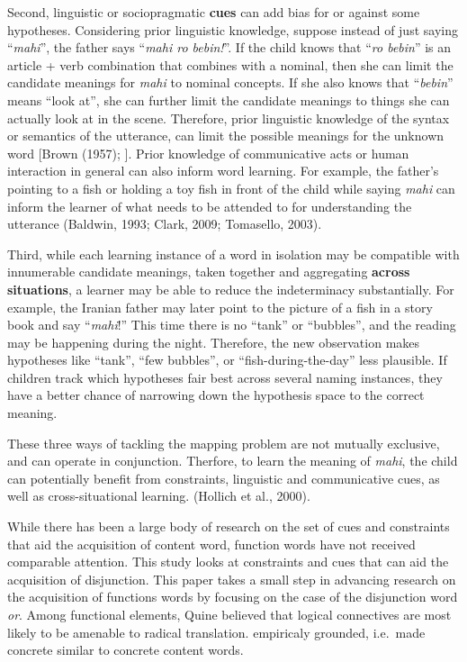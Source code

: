\documentclass[,man,floatsintext]{apa6}
\begin{document}
Second, linguistic or sociopragmatic \textbf{cues} can add bias for or against some hypotheses. Considering prior linguistic knowledge, suppose instead of just saying \enquote{\emph{mahi}}, the father says \enquote{\emph{mahi ro bebin!}}. If the child knows that \enquote{\emph{ro bebin}} is an article + verb combination that combines with a nominal, then she can limit the candidate meanings for \emph{mahi} to nominal concepts. If she also knows that \enquote{\emph{bebin}} means \enquote{look at}, she can further limit the candidate meanings to things she can actually look at in the scene. Therefore, prior linguistic knowledge of the syntax or semantics of the utterance, can limit the possible meanings for the unknown word {[}Brown (1957); {]}. Prior knowledge of communicative acts or human interaction in general can also inform word learning. For example, the father's pointing to a fish or holding a toy fish in front of the child while saying \emph{mahi} can inform the learner of what needs to be attended to for understanding the utterance (Baldwin, 1993; Clark, 2009; Tomasello, 2003).

Third, while each learning instance of a word in isolation may be compatible with innumerable candidate meanings, taken together and aggregating \textbf{across situations}, a learner may be able to reduce the indeterminacy substantially. For example, the Iranian father may later point to the picture of a fish in a story book and say \enquote{\emph{mahi}!} This time there is no \enquote{tank} or \enquote{bubbles}, and the reading may be happening during the night. Therefore, the new observation makes hypotheses like \enquote{tank}, \enquote{few bubbles}, or \enquote{fish-during-the-day} less plausible. If children track which hypotheses fair best across several naming instances, they have a better chance of narrowing down the hypothesis space to the correct meaning.

These three ways of tackling the mapping problem are not mutually exclusive, and can operate in conjunction. Therfore, to learn the meaning of \emph{mahi}, the child can potentially benefit from constraints, linguistic and communicative cues, as well as cross-situational learning. (Hollich et al., 2000).

While there has been a large body of research on the set of cues and constraints that aid the acquisition of content word, function words have not received comparable attention. This study looks at constraints and cues that can aid the acquisition of disjunction. This paper takes a small step in advancing research on the acquisition of functions words by focusing on the case of the disjunction word \emph{or}. Among functional elements, Quine believed that logical connectives are most likely to be amenable to radical translation. empiricaly grounded, i.e.~made concrete similar to concrete content words.
\end{document}
